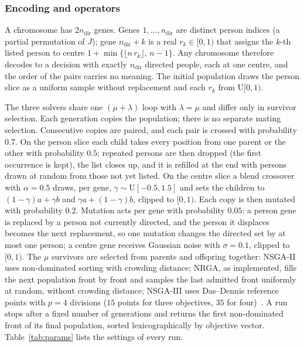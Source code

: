 \subsubsection{Encoding and operators}
A chromosome has $2n_{\mathrm{dir}}$ genes. Genes $1,\dots,n_{\mathrm{dir}}$ are distinct
person indices (a partial permutation of $J$); gene $n_{\mathrm{dir}}+k$ is a real
$r_k\in[0,1)$ that assigns the $k$-th listed person to centre
$1+\min\{\lfloor n\,r_k\rfloor,\,n-1\}$. Any chromosome therefore decodes to a decision with
exactly $n_{\mathrm{dir}}$ directed people, each at one centre, and the order of the pairs
carries no meaning. The initial population draws the person slice as a uniform sample
without replacement and each $r_k$ from $\mathrm{U}[0,1)$.

The three solvers share one $(\mu+\lambda)$ loop with $\lambda=\mu$ and differ only in
survivor selection. Each generation copies the population; there is no separate mating
selection. Consecutive copies are paired, and each pair is crossed with probability $0.7$.
On the person slice each child takes every position from one parent or the other with
probability $0.5$; repeated persons are then dropped (the first occurrence is kept), the list
closes up, and it is refilled at the end with persons drawn at random from those not yet
listed. On the centre slice a blend crossover with $\alpha=0.5$ draws, per gene,
$\gamma\sim\mathrm{U}[-0.5,1.5]$ and sets the children to $(1-\gamma)a+\gamma b$ and
$\gamma a+(1-\gamma)b$, clipped to $[0,1)$. Each copy is then mutated with probability $0.2$.
Mutation acts per gene with probability $0.05$: a person gene is replaced by a person not
currently directed, and the person it displaces becomes the next replacement, so one
mutation changes the directed set by at most one person; a centre gene receives Gaussian
noise with $\sigma=0.1$, clipped to $[0,1)$. The $\mu$ survivors are selected from parents
and offspring together: NSGA-II uses non-dominated sorting with crowding distance; NRGA, as implemented,
fills the next population front by front and samples the last admitted front uniformly at
random, without crowding distance; NSGA-III uses Das--Dennis reference points with $p=4$
divisions ($15$ points for three objectives, $35$ for four)~\cite{deb2014nsga3}. A run stops
after a fixed number of generations and returns the first non-dominated front of its final population, sorted
lexicographically by objective vector. Table~\ref{tab:params} lists the settings of every run.

